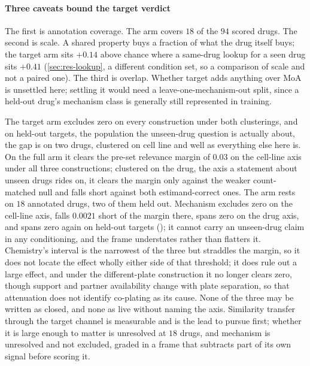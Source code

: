 \paragraph{Three caveats bound the target verdict} The first is annotation
coverage. The arm covers $18$ of the $94$ scored drugs. The second is scale. A
shared property buys a fraction of what the drug itself buys; the target arm sits
$+0.14$ above chance where a same-drug lookup for a seen drug sits $+0.41$
(\cref{sec:res-lookup}, a different condition set, so a comparison of scale and
not a paired one). The third is overlap. Whether target adds anything over MoA is
unsettled here; settling it would need a leave-one-mechanism-out split, since a
held-out drug's mechanism class is generally still represented in training.

\begin{claim}
The target arm excludes zero on every construction under both clusterings, and on
held-out targets, the population the unseen-drug question is actually about, the
gap is  on two drugs, clustered on cell line and
well as everything else here is. On the full arm it clears the pre-set relevance
margin of $0.03$ on the cell-line axis under all three constructions; clustered
on the drug, the axis a statement about unseen drugs rides on, it clears the
margin only against the weaker count-matched null and falls short against both
estimand-correct ones. The arm rests on $18$ annotated drugs, two of them held
out. Mechanism excludes zero on the cell-line axis, falls $0.0021$ short of the
margin there, spans zero on the drug axis, and spans zero again on held-out
targets (); it cannot carry an unseen-drug claim in
any conditioning, and the frame understates rather than flatters it. Chemistry's
interval is the narrowest of the three but straddles the margin, so it does not
locate the effect wholly either side of that threshold; it does rule out a large
effect, and under the different-plate construction it no longer clears zero,
though support and partner availability change with plate separation, so that
attenuation does not identify co-plating as its cause. None of the three may be
written as closed, and none as live without naming the axis. Similarity transfer
through the target channel is measurable and is the lead to pursue first; whether
it is large enough to matter is unresolved at $18$ drugs, and mechanism is
unresolved and not excluded, graded in a frame that subtracts part of its own
signal before scoring it.
\end{claim}

